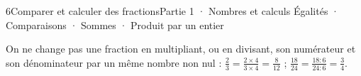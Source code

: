 \begin{ouverture}[calcul]{6}{Comparer et calculer des fractions}{Partie 1 · Nombres et calculs}
{Égalités · Comparaisons · Sommes · Produit par un entier}
\end{ouverture}
\pagestyle{otMain}\essentiel\fontsize{11}{15}\selectfont
{}\label{cours-6-1}
\begin{propriete}On ne change pas une fraction en multipliant, ou en divisant, son numérateur et son dénominateur par un même nombre non nul : $\frac23=\frac{2\times4}{3\times4}=\frac8{12}$ ; $\frac{18}{24}=\frac{18:6}{24:6}=\frac34$.\end{propriete}
\label{fig-cours-6-1-cours-bandes-egales}

